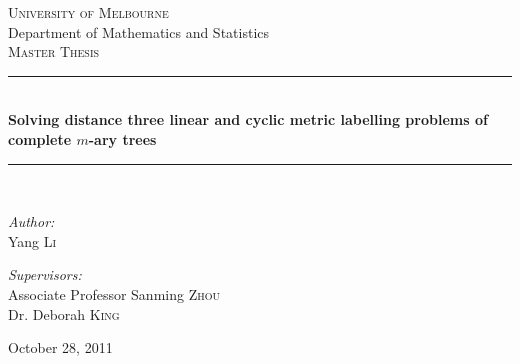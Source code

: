 \documentclass[11pt, a4paper]{book}
\newcommand{\HRule}{\rule{\linewidth}{0.5mm}}
\begin{document}
\onehalfspacing
\begin{titlepage}

\begin{center}



\textsc{\LARGE University of Melbourne}\\
{\large Department of Mathematics and Statistics}\\[1.5cm]

\textsc{\Large Master Thesis}\\[0.5cm]


\HRule \\[0.4cm]
{ \LARGE  \bf Solving distance three linear and cyclic metric labelling problems of complete $m$-ary trees }\\[0.4cm]

\HRule \\[1.5cm]


\begin{minipage}{0.4\textwidth}
\begin{flushleft} \large
\emph{Author:}\\
Yang \textsc{Li}
\end{flushleft}
\end{minipage}
\begin{minipage}{0.4\textwidth}
\begin{flushright} \large
\emph{Supervisors:} \\
Associate Professor Sanming \textsc{Zhou}\\
Dr. Deborah \textsc{King}
\end{flushright}
\end{minipage}

\vfill


{\large October 28, 2011}

\end{center}

\end{titlepage}
 
\frontmatter
 

 


\tableofcontents            %
\listoffigures              %


\mainmatter








%





\end{document}

